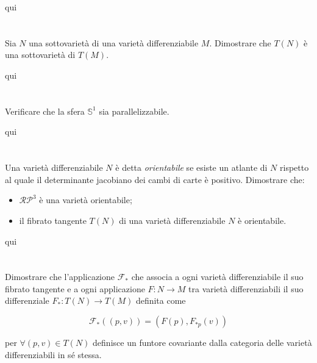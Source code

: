 qui




\tocless\section{}\label{es2-25}

\begin{tcolorbox}
	Sia $ N $ una sottovarietà di una varietà differenziabile $ M $. Dimostrare che $ T(N) $ è una sottovarietà di $ T(M) $.
\end{tcolorbox}

qui

\tocless\section{}\label{BONUS2-4}

\begin{tcolorbox}
	Verificare che la sfera $ \mathbb{S}^{1} $ sia parallelizzabile.
\end{tcolorbox}

qui

\tocless\section{}\label{es2-26}

\begin{tcolorbox}
	Una varietà differenziabile $ N $ è detta \textit{orientabile} se esiste un atlante di $ N $ rispetto al quale il determinante jacobiano dei cambi di carte è positivo. Dimostrare che:
	
	\begin{itemize}
		\item $ \mathcal{RP}^{3} $ è una varietà orientabile;
		\item il fibrato tangente $ T(N) $ di una varietà differenziabile $ N $ è orientabile.
	\end{itemize}
\end{tcolorbox}

qui

\tocless\section{}\label{es2-27}

\begin{tcolorbox}
	Dimostrare che l'applicazione $ \mathcal{F}_{*} $ che associa a ogni varietà differenziabile il suo fibrato tangente e a ogni applicazione $ F : N \to M $ tra varietà differenziabili il suo differenziale $ F_{*} : T(N) \to T(M) $ definita come
	
	\begin{equation}
		\mathcal{F}_{*}((p,v)) = (F(p), F_{*p}(v))
	\end{equation}

	per $ \forall (p,v) \in T(N) $ definisce un funtore covariante dalla categoria delle varietà differenziabili in sé stessa.
\end{tcolorbox}

